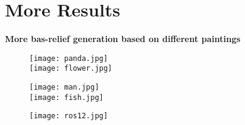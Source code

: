 \section{More Results} \label{more results}
\textbf{More bas-relief generation based on different paintings}
\begin{figure}[H]
	\centering
	\texttt{[image: panda.jpg]}\\
	\centering
	\texttt{[image: flower.jpg]}
\end{figure} 
\begin{figure}[H]
	\centering
	\texttt{[image: man.jpg]}\\
	\centering
	\texttt{[image: fish.jpg]}
\end{figure} \label{ch2}

\begin{figure}[H]
	\centering
	\texttt{[image: ros12.jpg]}\\
\end{figure}